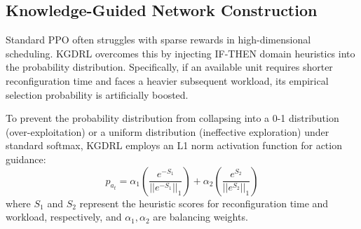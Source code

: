 \subsection{Knowledge-Guided Network Construction}
Standard PPO often struggles with sparse rewards in high-dimensional scheduling. KGDRL overcomes this by injecting IF-THEN domain heuristics into the probability distribution. Specifically, if an available unit requires shorter reconfiguration time and faces a heavier subsequent workload, its empirical selection probability is artificially boosted.

To prevent the probability distribution from collapsing into a 0-1 distribution (over-exploitation) or a uniform distribution (ineffective exploration) under standard softmax, KGDRL employs an L1 norm activation function for action guidance:
\begin{equation}
    p_{a_{t}} = \alpha_{1}\left(\frac{e^{-S_{1}}}{||e^{-S_{1}}||_{1}}\right) + \alpha_{2}\left(\frac{e^{S_{2}}}{||e^{S_{2}}||_{1}}\right)
\end{equation}
where $S_1$ and $S_2$ represent the heuristic scores for reconfiguration time and workload, respectively, and $\alpha_1, \alpha_2$ are balancing weights.


